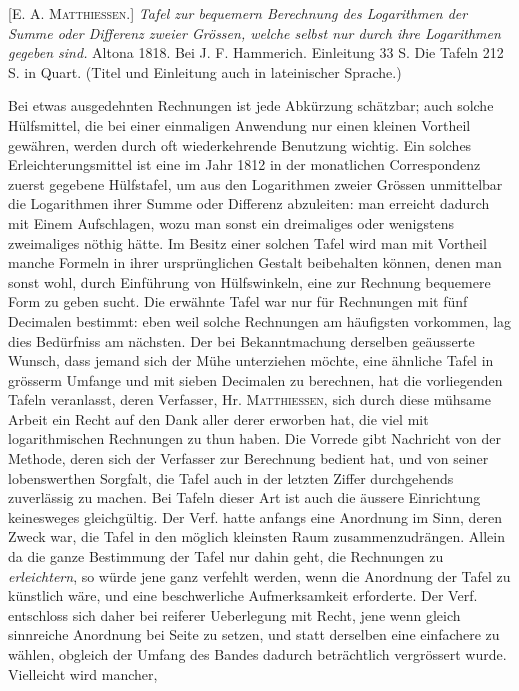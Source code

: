 [E. A. \textsc{Matthiessen}.] \textit{Tafel zur bequemern Berechnung des Logarithmen der
Summe oder Differenz zweier Grössen, welche selbst nur durch ihre Logarithmen gegeben sind.} Altona 1818. Bei J. F. Hammerich. Einleitung 33 S. Die Tafeln
212 S. in Quart. (Titel und Einleitung auch in lateinischer Sprache.)

Bei etwas ausgedehnten Rechnungen ist jede Abkürzung schätzbar; auch
solche Hülfsmittel, die bei einer einmaligen Anwendung nur einen kleinen Vortheil gewähren, werden durch oft wiederkehrende Benutzung wichtig. Ein solches Erleichterungsmittel ist eine im Jahr 1812 in der monatlichen Correspondenz
zuerst gegebene Hülfstafel, um aus den Logarithmen zweier Grössen unmittelbar
die Logarithmen ihrer Summe oder Differenz abzuleiten: man erreicht dadurch
mit Einem Aufschlagen, wozu man sonst ein dreimaliges oder wenigstens zweimaliges nöthig hätte. Im Besitz einer solchen Tafel wird man mit Vortheil manche
Formeln in ihrer ursprünglichen Gestalt beibehalten können, denen man sonst
wohl, durch Einführung von Hülfswinkeln, eine zur Rechnung bequemere Form
zu geben sucht. Die erwähnte Tafel war nur für Rechnungen mit fünf Decimalen
bestimmt: eben weil solche Rechnungen am häufigsten vorkommen, lag dies Bedürfniss am nächsten. Der bei Bekanntmachung derselben geäusserte Wunsch,
dass jemand sich der Mühe unterziehen möchte, eine ähnliche Tafel in grösserm
Umfange und mit sieben Decimalen zu berechnen, hat die vorliegenden Tafeln
veranlasst, deren Verfasser, Hr. \textsc{Matthiessen}, sich durch diese mühsame Arbeit
ein Recht auf den Dank aller derer erworben hat, die viel mit logarithmischen
Rechnungen zu thun haben. Die Vorrede gibt Nachricht von der Methode, deren sich der Verfasser zur Berechnung bedient hat, und von seiner lobenswerthen
Sorgfalt, die Tafel auch in der letzten Ziffer durchgehends zuverlässig zu machen.
Bei Tafeln dieser Art ist auch die äussere Einrichtung keinesweges gleichgültig.
Der Verf. hatte anfangs eine Anordnung im Sinn, deren Zweck war, die Tafel in
den möglich kleinsten Raum zusammenzudrängen. Allein da die ganze Bestimmung der Tafel nur dahin geht, die Rechnungen zu \textit{erleichtern}, so würde jene
ganz verfehlt werden, wenn die Anordnung der Tafel zu künstlich wäre, und eine
beschwerliche Aufmerksamkeit erforderte. Der Verf. entschloss sich daher bei
reiferer Ueberlegung mit Recht, jene wenn gleich sinnreiche Anordnung bei Seite
zu setzen, und statt derselben eine einfachere zu wählen, obgleich der Umfang
des Bandes dadurch beträchtlich vergrössert wurde. Vielleicht wird mancher,
